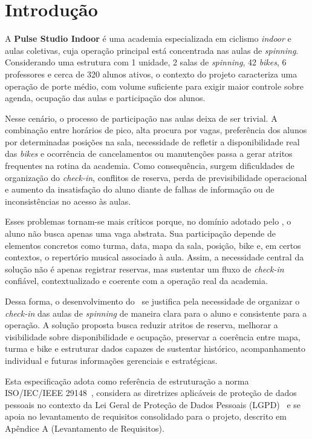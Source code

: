 
\section{Introdução}

A \textbf{Pulse Studio Indoor} é uma academia especializada em ciclismo \textit{indoor} e aulas coletivas, cuja operação principal está concentrada nas aulas de \textit{spinning}. Considerando uma estrutura com 1 unidade, 2 salas de \textit{spinning}, 42 \textit{bikes}, 6 professores e cerca de 320 alunos ativos, o contexto do projeto caracteriza uma operação de porte médio, com volume suficiente para exigir maior controle sobre agenda, ocupação das aulas e participação dos alunos.

Nesse cenário, o processo de participação nas aulas deixa de ser trivial. A combinação entre horários de pico, alta procura por vagas, preferência dos alunos por determinadas posições na sala, necessidade de refletir a disponibilidade real das \textit{bikes} e ocorrência de cancelamentos ou manutenções passa a gerar atritos frequentes na rotina da academia. Como consequência, surgem dificuldades de organização do \textit{check-in}, conflitos de reserva, perda de previsibilidade operacional e aumento da insatisfação do aluno diante de falhas de informação ou de inconsistências no acesso às aulas.

Esses problemas tornam-se mais críticos porque, no domínio adotado pelo \ProjetoNome, o aluno não busca apenas uma vaga abstrata. Sua participação depende de elementos concretos como turma, data, mapa da sala, posição, bike e, em certos contextos, o repertório musical associado à aula. Assim, a necessidade central da solução não é apenas registrar reservas, mas sustentar um fluxo de \textit{check-in} confiável, contextualizado e coerente com a operação real da academia.

Dessa forma, o desenvolvimento do \ProjetoNome\ se justifica pela necessidade de organizar o \textit{check-in} das aulas de \textit{spinning} de maneira clara para o aluno e consistente para a operação. A solução proposta busca reduzir atritos de reserva, melhorar a visibilidade sobre disponibilidade e ocupação, preservar a coerência entre mapa, turma e bike e estruturar dados capazes de sustentar histórico, acompanhamento individual e futuras informações gerenciais e estratégicas.

Esta especificação adota como referência de estruturação a norma ISO/IEC/IEEE 29148~\cite{iso29148}, considera as diretrizes aplicáveis de proteção de dados pessoais no contexto da Lei Geral de Proteção de Dados Pessoais (LGPD)~\cite{lgpd} e se apoia no levantamento de requisitos consolidado para o projeto, descrito em Apêndice A (Levantamento de Requisitos).

